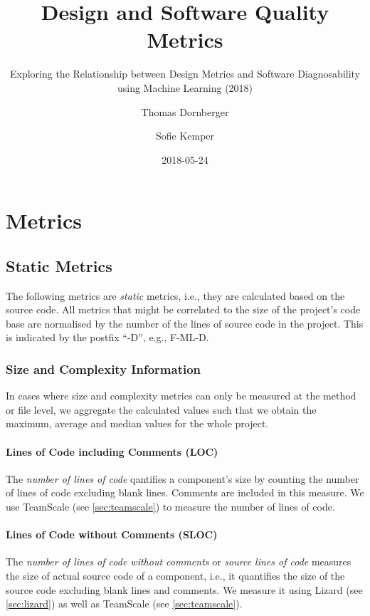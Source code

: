\documentclass{scrartcl}
\begin{document}
\title{Design and Software Quality Metrics}
\subtitle{Exploring the Relationship between Design Metrics and Software
Diagnosability using Machine Learning (2018)}
\author{Thomas Dornberger \and Sofie Kemper}
\date{2018-05-24}

\maketitle

\section{Metrics}

\subsection{Static Metrics}

The following metrics are \emph{static} metrics, i.e., they are calculated based
on the source code. All metrics that might be correlated to the size of the
project's code base are normalised by the number of the lines of source code in
the project. This is indicated by the postfix \enquote{-D}, e.g., F-ML-D.

\subsubsection{Size and Complexity Information}

In cases where size and complexity metrics can only be measured at the method or
file level, we aggregate the calculated values such that we obtain the maximum,
average and median values for the whole project.

\paragraph{Lines of Code including Comments (LOC)}

The \emph{number of lines of code} qantifies a component's size by counting the
number of lines of code excluding blank lines. Comments are included in this
measure. We use TeamScale (see \ref{sec:teamscale}) to measure the number of
lines of code.

\paragraph{Lines of Code without Comments (SLOC)}

The \emph{number of lines of code without comments} or \emph{source lines of
code} measures the size of actual
source code of a component, i.e., it quantifies the size of the source code
excluding blank lines and comments. We measure it using Lizard (see
\ref{sec:lizard}) as well as TeamScale (see \ref{sec:teamscale}).
\end{document}
